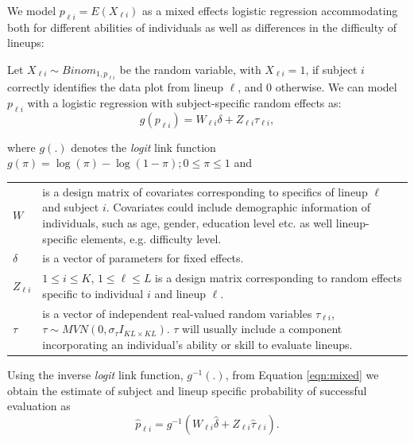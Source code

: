 \documentclass{article}
\newcommand{\red}[1]{{\color{red} #1}}
\newcommand{\hh}[1]{{\color{orange} #1}} %
\begin{document}
\hh{
We model $p_{\ell i} = E(X_{\ell i})$ as  a mixed effects logistic regression
 accommodating both for different abilities of individuals as well as differences in the difficulty of lineups: 


Let $X_{\ell i} \sim Binom_{1, p_{\ell i}}$ be the random variable, with $X_{ \ell i}= 1$, if  subject $i$ correctly identifies the data plot from lineup $\ell$, and 0 otherwise.
We can model $p_{ \ell i}$ with a logistic regression with subject-specific random effects as:
\begin{equation} \label{eqn:mixed}
g( p_{\ell i} )= W_{\ell i} \delta +  Z_{\ell i}  \tau_{\ell i},  
\end{equation}

where $g(.)$ denotes the {\it logit} link function $g(\pi)=\log(\pi) - \log(1-\pi); 0 \le \pi \le 1$ and

\begin{tabular}{lp{5.5in}}
$W$  & is a design matrix of covariates corresponding to specifics of lineup $\ell$ and subject $i$. Covariates could include  demographic information of individuals, such as age, gender, education level etc. as well lineup-specific elements, e.g. difficulty level. \\
$\delta$ & is a vector of parameters for fixed effects.\\
$Z_{\ell i}$ & $1 \le i \le K$, $1 \le \ell \le L$  is a design matrix corresponding to random effects specific to individual $i$ and lineup $\ell$.  \\
$\tau$ & is a vector of independent real-valued random variables $\tau_{\ell i}$,  $\tau  \sim  MVN(0,\sigma_\tau I_{KL \times KL})$. $\tau$ will usually include a component incorporating an individual's ability or skill to evaluate lineups.\\
\end{tabular}
}

Using the inverse {\it logit} link function, $g^{-1}(.)$, from  Equation \ref{eqn:mixed} we obtain the estimate of subject and lineup specific probability of successful evaluation as 
\begin{equation} \label{eqn:mixed_power}
\hat p_{\ell i} =  g^{-1}(W_{\ell i} \hat {\delta} +  Z_{\ell i}  \hat {\tau}_{\ell i}).
\end{equation}



\end{document}
